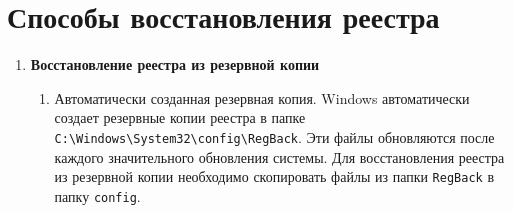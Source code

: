 \documentclass[a4paper, 14pt]{report}
\begin{document}
\section{Способы восстановления реестра}
\begin{enumerate}
    \item {\textbf{Восстановление реестра из резервной копии}
          \begin{enumerate}
              \item {Автоматически созданная резервная копия.
                    Windows автоматически создает резервные копии реестра в папке \verb|C:\Windows\System32\config\RegBack|. Эти файлы обновляются после каждого значительного обновления системы. Для восстановления реестра из резервной копии необходимо скопировать файлы из папки \verb|RegBack| в папку \verb|config|.

}
\end{enumerate}}
\end{enumerate}
\end{document}
